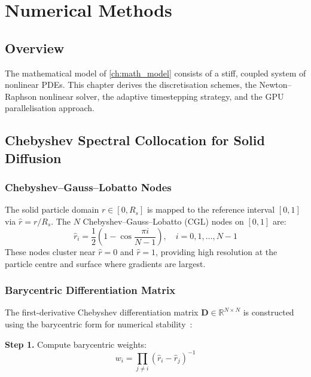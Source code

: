\chapter{Numerical Methods}
\label{ch:numerics}

\section{Overview}

The mathematical model of \cref{ch:math_model} consists of a stiff, coupled system of nonlinear PDEs. This chapter derives the discretisation schemes, the Newton--Raphson nonlinear solver, the adaptive timestepping strategy, and the GPU parallelisation approach.

\section{Chebyshev Spectral Collocation for Solid Diffusion}
\label{sec:cheb_solid}

\subsection{Chebyshev--Gauss--Lobatto Nodes}

The solid particle domain $r \in [0, R_s]$ is mapped to the reference interval $[0,1]$ via $\hat{r} = r/R_s$. The $N$ Chebyshev--Gauss--Lobatto (CGL) nodes on $[0,1]$ are:
\begin{equation}
  \hat{r}_i = \frac{1}{2}\left(1 - \cos\frac{\pi i}{N-1}\right), \quad i = 0, 1, \ldots, N-1
  \label{eq:cgl_nodes}
\end{equation}
These nodes cluster near $\hat{r} = 0$ and $\hat{r} = 1$, providing high resolution at the particle centre and surface where gradients are largest.

\subsection{Barycentric Differentiation Matrix}

The first-derivative Chebyshev differentiation matrix $\mathbf{D} \in \mathbb{R}^{N \times N}$ is constructed using the barycentric form for numerical stability~\cite{Trefethen2000}:

\textbf{Step 1.} Compute barycentric weights:
\begin{equation}
  w_i = \prod_{j \neq i} (\hat{r}_i - \hat{r}_j)^{-1}
  \label{eq:bary_weights}
\end{equation}

